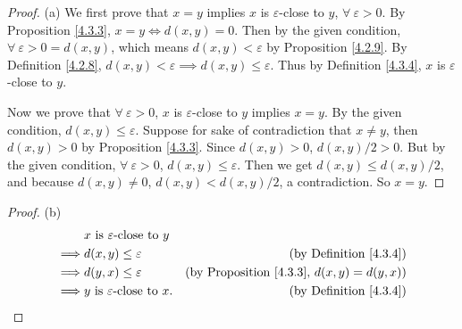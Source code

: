 \begin{proof}{(a)}
    We first prove that \(x = y\) implies \(x\) is \(\varepsilon\)-close to \(y\), \(\forall\ \varepsilon > 0\).
    By Proposition \ref{4.3.3}, \(x = y \iff d(x, y) = 0\).
    Then by the given condition, \(\forall\ \varepsilon > 0 = d(x, y)\), which means \(d(x, y) < \varepsilon\) by Proposition \ref{4.2.9}.
    By Definition \ref{4.2.8}, \(d(x, y) < \varepsilon \implies d(x, y) \leq \varepsilon\).
    Thus by Definition \ref{4.3.4}, \(x\) is \(\varepsilon\)-close to \(y\).

    Now we prove that \(\forall\ \varepsilon > 0\), \(x\) is \(\varepsilon\)-close to \(y\) implies \(x = y\).
    By the given condition, \(d(x, y) \leq \varepsilon\).
    Suppose for sake of contradiction that \(x \neq y\), then \(d(x, y) > 0\) by Proposition \ref{4.3.3}.
    Since \(d(x, y) > 0\), \(d(x, y) / 2 > 0\).
    But by the given condition, \(\forall\ \varepsilon > 0\), \(d(x, y) \leq \varepsilon\).
    Then we get \(d(x, y) \leq d(x, y) / 2\), and because \(d(x, y) \neq 0\), \(d(x, y) < d(x, y) / 2\), a contradiction.
    So \(x = y\).
\end{proof}

\begin{proof}{(b)}
    \begin{align*}
                 & x \text{ is \(\varepsilon\)-close to } y                                                               \\
        \implies & d(x, y) \leq \varepsilon                  & \text{(by Definition \ref{4.3.4})}                         \\
        \implies & d(y, x) \leq \varepsilon                  & \text{(by Proposition \ref{4.3.3}, \(d(x, y) = d(y, x)\))} \\
        \implies & y \text{ is \(\varepsilon\)-close to } x. & \text{(by Definition \ref{4.3.4})}
    \end{align*}
\end{proof}

